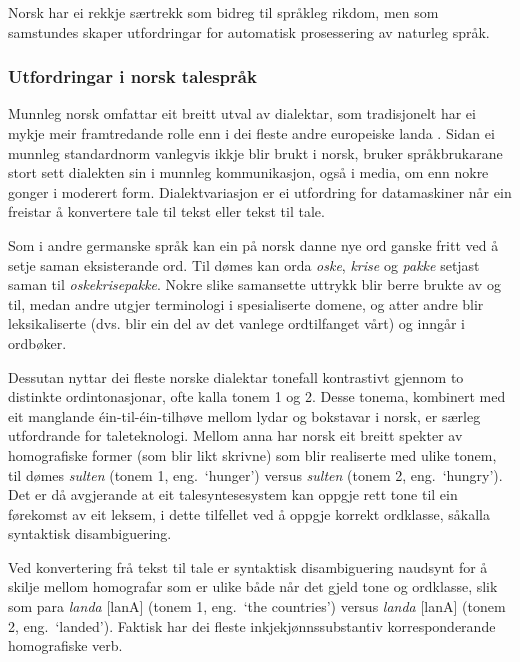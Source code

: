 \begin{multicols}{2}
Norsk har ei rekkje særtrekk som bidreg til språkleg rikdom, men som samstundes skaper utfordringar for automatisk prosessering av naturleg språk.

\subsubsection{Utfordringar i norsk talespråk}
Munnleg norsk omfattar eit breitt utval av dialektar, som tradisjonelt har ei mykje meir framtredande rolle enn i dei fleste andre europeiske landa \cite{stm35:2008}.
Sidan ei munnleg standardnorm vanlegvis ikkje blir brukt i norsk, bruker språkbrukarane stort sett dialekten sin i munnleg kommunikasjon, også i media, om enn nokre gonger i moderert form. 
Dialektvariasjon er ei utfordring for datamaskiner når ein freistar å konvertere tale til tekst eller tekst til tale.


Som i andre germanske språk kan ein på norsk danne nye ord ganske fritt ved å setje saman eksisterande ord. Til dømes kan orda \textit{oske}, \textit{krise} og \textit{pakke} setjast saman til \textit{oskekrisepakke}.
Nokre slike samansette uttrykk blir berre brukte av og til, medan andre utgjer terminologi i spesialiserte domene, og atter andre blir leksikaliserte (dvs. blir ein del av det vanlege ordtilfanget vårt) og inngår i ordbøker. 

Dessutan nyttar dei fleste norske dialektar tonefall kontrastivt gjennom to distinkte ordintonasjonar, ofte kalla tonem 1 og 2. Desse tonema, kombinert med eit manglande éin-til-éin-tilhøve mellom lydar og bokstavar i norsk, er særleg utfordrande for taleteknologi. Mellom anna har norsk eit breitt spekter av homografiske former (som blir likt skrivne) som blir realiserte med ulike tonem, til dømes  \textit{sulten} (tonem 1, eng.~`hunger') versus \textit{sulten} (tonem 2, eng.~`hungry'). Det er då avgjerande at eit talesyntesesystem kan oppgje rett tone til ein førekomst av eit leksem, i dette tilfellet ved å oppgje korrekt ordklasse, såkalla syntaktisk disambiguering. 

Ved konvertering frå tekst til tale er syntaktisk disambiguering naudsynt for å skilje mellom homografar som er ulike både når det gjeld tone og ordklasse, slik som para \textit{landa} {[}lanA{]} (tonem 1, eng.~`the countries') versus \textit{landa} {[}lanA{]} (tonem 2, eng.~`landed'). 
Faktisk har dei fleste inkjekjønnssubstantiv korresponderande homografiske verb. 


\end{multicols}
